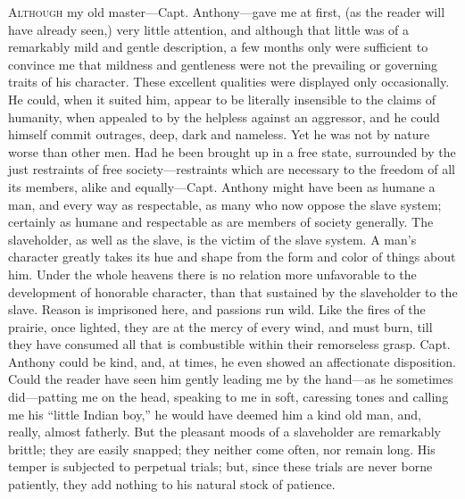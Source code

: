 \textsc{Although} my old master---Capt. Anthony---gave me at first, (as
the reader will have already seen,) very little attention, and although
that little was of a remarkably mild and gentle description, a few
months only were sufficient to convince me that mildness and gentleness
were not the prevailing or governing traits of his character. These
excellent qualities were displayed only occasionally. He could, when it
suited him, appear to be literally insensible to the claims of humanity,
when appealed to by the helpless against an aggressor, and he could
himself commit outrages, deep, dark and nameless. Yet he was not by
nature worse than other men. Had he been brought up in a free state,
surrounded by the just restraints of free society---restraints which are
necessary to the freedom of all its members, alike and equally---Capt.
Anthony might have been as {\protect\hypertarget{80}{}{}}humane a man,
and every way as respectable, as many who now oppose the slave system;
certainly as humane and respectable as are members of society generally.
The slaveholder, as well as the slave, is the victim of the slave
system. A man's character greatly takes its hue and shape from the form
and color of things about him. Under the whole heavens there is no
relation more unfavorable to the development of honorable character,
than that sustained by the slaveholder to the slave. Reason is
imprisoned here, and passions run wild. Like the fires of the prairie,
once lighted, they are at the mercy of every wind, and must burn, till
they have consumed all that is combustible within their remorseless
grasp. Capt. Anthony could be kind, and, at times, he even showed an
affectionate disposition. Could the reader have seen him gently leading
me by the hand---as he sometimes did---patting me on the head, speaking
to me in soft, caressing tones and calling me his ``little Indian boy,''
he would have deemed him a kind old man, and, really, almost fatherly.
But the pleasant moods of a slaveholder are remarkably brittle; they are
easily snapped; they neither come often, nor remain long. His temper is
subjected to perpetual trials; but, since these trials are never borne
patiently, they add nothing to his natural stock of patience.

